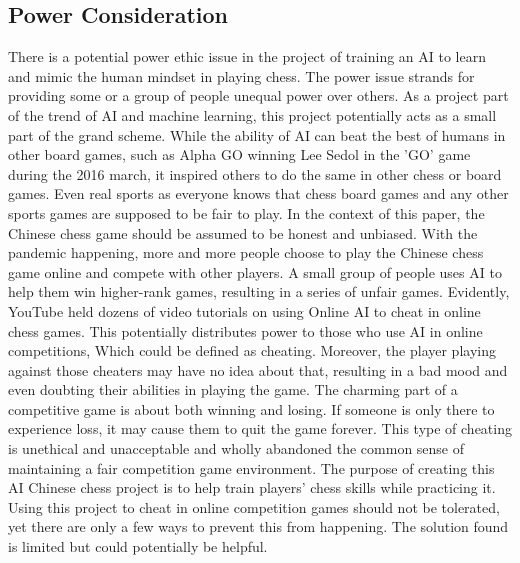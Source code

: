 \documentclass[10pt,twocolumn]{article}
\begin{document}
\subsection{Power Consideration}
    There is a potential power ethic issue in the project of training an AI to learn and mimic the human mindset in playing chess. The power issue strands for providing some or a group of people unequal power over others. As a project part of the trend of AI and machine learning, this project potentially acts as a small part of the grand scheme. While the ability of AI can beat the best of humans in other board games, such as Alpha GO winning Lee Sedol in the 'GO' game during the 2016 march, it inspired others to do the same in other chess or board games\cite{AlphaGo}. Even real sports as everyone knows that chess board games and any other sports games are supposed to be fair to play. In the context of this paper, the Chinese chess game should be assumed to be honest and unbiased. With the pandemic happening, more and more people choose to play the Chinese chess game online and compete with other players. A small group of people uses AI to help them win higher-rank games, resulting in a series of unfair games. Evidently, YouTube held dozens of video tutorials on using Online AI to cheat in online chess games. This potentially distributes power to those who use AI in online competitions, Which could be defined as cheating. Moreover, the player playing against those cheaters may have no idea about that, resulting in a bad mood and even doubting their abilities in playing the game. The charming part of a competitive game is about both winning and losing. If someone is only there to experience loss, it may cause them to quit the game forever. This type of cheating is unethical and unacceptable and wholly abandoned the common sense of maintaining a fair competition game environment. The purpose of creating this AI Chinese chess project is to help train players' chess skills while practicing it. Using this project to cheat in online competition games should not be tolerated, yet there are only a few ways to prevent this from happening. The solution found is limited but could potentially be helpful. 
\end{document}
